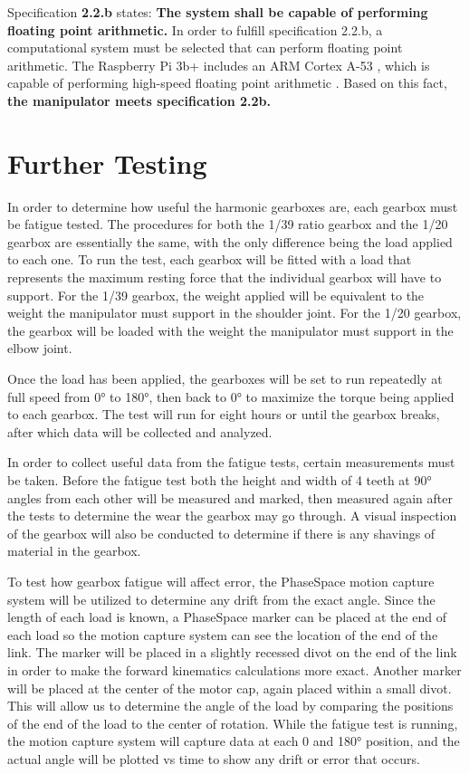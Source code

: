 Specification \textbf{2.2.b} states: \textbf{The system shall be capable of performing floating point arithmetic.} In order to fulfill specification 2.2.b, a computational system must be selected that can perform floating point arithmetic. The Raspberry Pi 3b+ includes an ARM Cortex A-53 \cite{rpi}, which is capable of performing high-speed floating point arithmetic \cite{arm}. Based on this fact, \textbf{the manipulator meets specification 2.2b.}


\section{Further Testing}

In order to determine how useful the harmonic gearboxes are, each gearbox must be fatigue tested. The procedures for both the 1/39 ratio gearbox and the 1/20 gearbox are essentially the same, with the only difference being the load applied to each one. To run the test, each gearbox will be fitted with a load that represents the maximum resting force that the individual gearbox will have to support. For the 1/39 gearbox, the weight applied will be equivalent to the weight the manipulator must support in the shoulder joint. For the 1/20 gearbox, the gearbox will be loaded with the weight the manipulator must support in the elbow joint.

Once the load has been applied, the gearboxes will be set to run repeatedly at full speed from 0° to 180°, then back to 0° to maximize the torque being applied to each gearbox. The test will run for eight hours or until the gearbox breaks, after which data will be collected and analyzed.

In order to collect useful data from the fatigue tests, certain measurements must be taken. Before the fatigue test both the height and width of 4 teeth at 90° angles from each other will be measured and marked, then measured again after the tests to determine the wear the gearbox may go through. A visual inspection of the gearbox will also be conducted to determine if there is any shavings of material in the gearbox.

To test how gearbox fatigue will affect error, the PhaseSpace motion capture system will be utilized to determine any drift from the exact angle. Since the length of each load is known, a PhaseSpace marker can be placed at the end of each load so the motion capture system can see the location of the end of the link. The marker will be placed in a slightly recessed divot on the end of the link in order to make the forward kinematics calculations more exact. Another marker will be placed at the center of the motor cap, again placed within a small divot. This will allow us to determine the angle of the load by comparing the positions of the end of the load to the center of rotation. While the fatigue test is running, the motion capture system will capture data at each 0 and 180° position, and the actual angle will be plotted vs time to show any drift or error that occurs.

